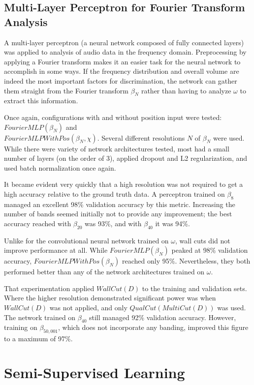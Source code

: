 \documentclass[10pt]{article}
\begin{document}
\subsection{Multi-Layer Perceptron for Fourier Transform Analysis}

A multi-layer perceptron (a neural network composed of fully connected layers) was applied to analysis of audio data in the frequency domain. Preprocessing by applying a Fourier transform makes it an easier task for the neural network to accomplish in some ways. If the frequency distribution and overall volume are indeed the most important factors for discrimination, the network can gather them straight from the Fourier transform $\beta_{N}$ rather than having to analyze $\omega$ to extract this information.

Once again, configurations with and without position input were tested: $FourierMLP(\beta_{N})$ and \\ $FourierMLPWithPos(\beta_{N}, \chi)$. Several different resolutions $N$ of $\beta_{N}$ were used. While there were variety of network architectures tested, most had a small number of layers (on the order of 3), applied dropout and L2 regularization, and used batch normalization once again.

It became evident very quickly that a high resolution was not required to get a high accuracy relative to the ground truth data. A perceptron trained on $\beta_{8}$ managed an excellent 98\% validation accuracy by this metric. Increasing the number of bands seemed initially not to provide any improvement; the best accuracy reached with $\beta_{20}$ was 93\%, and with $\beta_{40}$ it was 94\%.

Unlike for the convolutional neural network trained on $\omega$, wall cuts did not improve performance at all. While $FourierMLP(\beta_{N})$ peaked at 98\% validation accuracy, $FourierMLPWithPos(\beta_{N})$ reached only 95\%. Nevertheless, they both performed better than any of the network architectures trained on $\omega$.

That experimentation applied $WallCut(D)$ to the training and validation sets. Where the higher resolution demonstrated significant power was when $WallCut(D)$ was not applied, and only $QualCut(MultiCut(D))$ was used. The network trained on $\beta_{40}$ still managed 92\% validation accuracy. However, training on $\beta_{50,001}$, which does not incorporate any banding, improved this figure to a maximum of 97\%.

\section{Semi-Supervised Learning}
\end{document}
